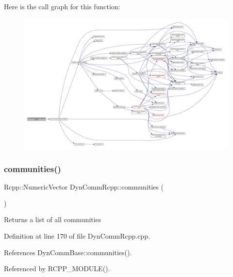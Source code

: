 Here is the call graph for this function\+:
\nopagebreak
\begin{figure}[H]
\begin{center}
\leavevmode
\includegraphics[width=350pt]{classDynCommRcpp_ae9fb6b69740abb2d52721ec76d744811_cgraph}
\end{center}
\end{figure}
\mbox{\label{classDynCommRcpp_ade6d5c2ebbb13f2efb3988d0d0ac2c1e}} 
\subsubsection{\texorpdfstring{communities()}{communities()}}
{\footnotesize\ttfamily Rcpp\+::\+Numeric\+Vector Dyn\+Comm\+Rcpp\+::communities (\begin{DoxyParamCaption}{ }\end{DoxyParamCaption})\hspace{0.3cm}{\ttfamily [inline]}}

\begin{DoxyReturn}{Returns}
a list of all communities 
\end{DoxyReturn}


Definition at line 170 of file Dyn\+Comm\+Rcpp.\+cpp.



References Dyn\+Comm\+Base\+::communities().



Referenced by R\+C\+P\+P\+\_\+\+M\+O\+D\+U\+L\+E().

